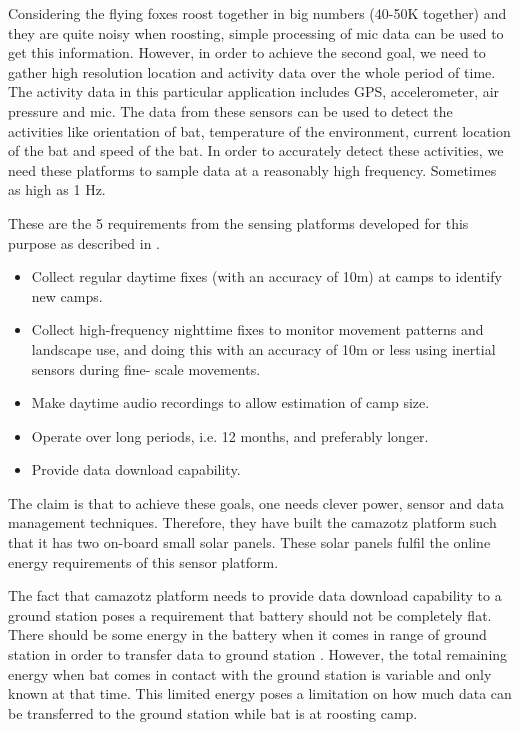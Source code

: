 \documentclass[conference]{IEEEtran}
\begin{document}
Considering the flying foxes roost together in big numbers (40-50K together) and they are 
quite noisy when roosting\cite{Shilton-2008}, simple processing of mic data can be used to 
get this information. However, in order to achieve the second goal, we need to gather high 
resolution location and activity data over the whole period of time. The activity data in 
this particular application includes GPS, accelerometer, air pressure and mic. The data from 
these sensors can be used to detect the activities like orientation of bat, temperature of 
the environment, current location of the bat and speed of the bat. In order to accurately 
detect these activities, we need these platforms to sample data at a reasonably high frequency. 
Sometimes as high as 1 Hz. \

These are the 5 requirements from the sensing platforms developed for this purpose as described 
in \cite{raja-ipsn}.
\begin{itemize}
\item Collect regular daytime fixes (with an accuracy of 10m) at camps to identify new camps.
\item Collect high-frequency nighttime fixes to monitor movement patterns and landscape use, and 
doing this with an accuracy of 10m or less using inertial sensors during fine- scale movements.
\item Make daytime audio recordings to allow estimation of camp size.
\item Operate over long periods, i.e. 12 months, and preferably longer.
\item Provide data download capability.
\end{itemize}

The claim is that to achieve these goals, one needs clever power, sensor and data management 
techniques. Therefore, they have built the camazotz platform such that it has two on-board small 
solar panels. These solar panels fulfil the online energy requirements of this sensor 
platform\cite{raja-ipsn}.\

The fact that camazotz platform needs to provide data download capability to a ground station 
poses a requirement that battery should not be completely flat. There should be some energy in 
the battery when it comes in range of ground station in order to transfer data to ground station
. However, the total remaining energy when bat comes in contact with the ground 
station is variable and only known at that time. This limited energy poses a limitation on 
how much data can be transferred to the ground station while bat is at roosting camp.\
\end{document}
